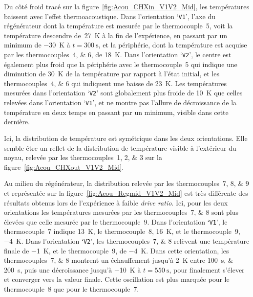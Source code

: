 Du côté froid tracé sur la figure~\ref{fig:Acou_CHXin_V1V2_Mid}, les températures baissent avec l'effet thermoacoustique. Dans l'orientation `\texttt{V1}', l'axe du régénérateur dont la température est mesurée par le thermocouple~\num{5}, voit la température descendre de~\qty{27}{\kelvin} à la fin de l'expérience, en passant par un minimum de \qty{-30}{\kelvin} à $t=\qty{300}{\second}$, et la périphérie, dont la température est acquise par les thermocouples~\numlist{4;6}, de \qty{18}{\kelvin}. Dans l'orientation `\texttt{V2}', le centre est également plus froid que la périphérie avec le thermocouple~\num{5} qui indique une diminution de \qty{30}{\kelvin} de la température par rapport à l'état initial, et les thermocouples~\numlist{4;6} qui indiquent une baisse de \qty{23}{\kelvin}. Les températures mesurées dans l'orientation `\texttt{V2}' sont globalement plus froide de \qty{10}{\kelvin} que celles relevées dans l'orientation `\texttt{V1}', et ne montre pas l'allure de décroissance de la température en deux temps en passant par un minimum, visible dans cette dernière.

Ici, la distribution de température est symétrique dans les deux orientations. Elle semble être un reflet de la distribution de température visible à l'extérieur du noyau, relevée par les thermocouples~\numlist{1;2;3} sur la figure~\ref{fig:Acou_CHXout_V1V2_Mid}.


Au milieu du régénérateur, la distribution relevée par les thermocouples~\numlist{7;8;9} et représentée sur la figure~\ref{fig:Acou_Regmid_V1V2_Mid} est très différente des résultats obtenus lors de l'expérience à faible \textit{drive ratio}. Ici, pour les deux orientations les températures mesurées par les thermocouples~\numlist{7;8} sont plus élevées que celle mesurée par le thermocouple~\num{9}. Dans l'orientation `\texttt{V1}', le thermocouple~\num{7} indique \qty{13}{\kelvin}, le thermocouple~\num{8}, \qty{16}{\kelvin}, et le thermocouple~\num{9}, \qty{-4}{\kelvin}. Dans l'orientation `\texttt{V2}', les thermocouples~\numlist{7;8} relèvent une température finale de \qty{-1}{\kelvin}, et le thermocouple~\num{9}, de \qty{-4}{\kelvin}. Dans cette orientation, les thermocouples~\numlist{7;8} montrent un échauffement jusqu'à \qty{2}{\kelvin} entre \qtylist{100;200}{\second}, puis une décroissance jusqu'à \qty{-10}{\kelvin} à $t=\qty{550}{\second}$, pour finalement s'élever et converger vers la valeur finale. Cette oscillation est plus marquée pour le thermocouple~\num{8} que pour le thermocouple~\num{7}.

